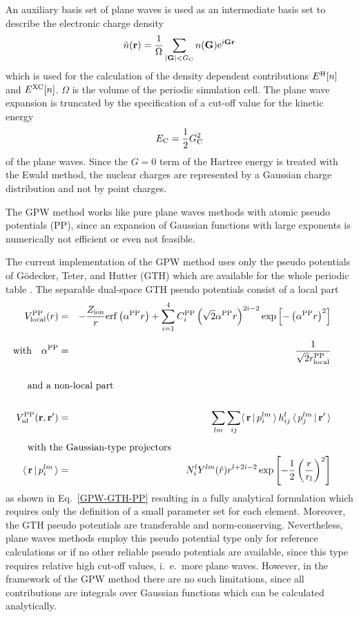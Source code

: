 \documentclass[12pt,twoside,a4paper]{article}
\newcommand{\be}{\begin{equation}}
\newcommand{\ee}{\end{equation}}
\newcommand{\nn}{\nonumber}
\begin{document}
An auxiliary basis set of plane waves is used as an intermediate basis set
to describe the electronic charge density
\be
 \tilde n({\bf r}) = \frac{1}{\Omega}\sum_{|{\bf G}| < G_{\rm C}}
                     n({\bf G}) {\rm e}^{i {\bf Gr}}
\ee
which is used for the calculation of the density dependent contributions
$E^{\rm H}[n]$ and $E^{\rm XC}[n]$.
$\Omega$ is the volume of the periodic simulation cell.
The plane wave expansion is truncated by the specification of a
cut-off value for the kinetic energy
\be
 E_{\rm C} = \frac{1}{2} G_{\rm C}^2
\ee
of the plane waves.
Since the $G = 0$ term of the Hartree energy is treated with the Ewald method,
the nuclear charges are represented by a Gaussian charge distribution and not
by point charges.

The GPW method works like pure plane waves methods with atomic pseudo
potentials (PP), since an expansion of Gaussian functions with large
exponents is numerically not efficient or even not feasible.

The current implementation of the GPW method uses only the pseudo potentials
of G\"o\-decker, Teter, and Hutter (GTH) \cite{GTH:1996} which are available for
the whole periodic table \cite{GTH:1998}. The separable dual-space GTH pseudo
potentials consist of a local part
\begin{eqnarray}
 V^{\rm PP}_{\rm local}(r)
  & = & -\frac{Z_{\rm ion}}{r} {\rm erf} \left( \alpha^{\rm PP} r \right) +
        \sum_{i=1}^4
         C^{\rm PP}_i \left( \sqrt{2} \alpha^{\rm PP} r \right)^{2i-2}
         \exp\left[ -\left( \alpha^{\rm PP} r \right)^2 \right]\\[2mm]
 \mbox{with}\quad\alpha^{\rm PP}
  & = & \frac{1}{\sqrt{2}r^{\rm PP}_{\rm local}}\nn\\[5mm]
\noalign{and a non-local part}\nn\\
 V^{\rm PP}_{\rm nl}({\bf r},{\bf r'}) & = &
  \sum\limits_{lm} \sum\limits_{ij} \langle\,{\bf r}\,|\,p_i^{lm} \,\rangle
  \,h_{ij}^{l}\,\langle\,p_j^{lm} \,|\,{\bf r'} \,\rangle \\[2mm]
 \noalign{with the Gaussian-type projectors}
 \langle\, {\bf r}\,|\,p_i^{lm}\,\rangle & = &
 N_i^{l} Y^{lm}(\hat r) r^{l+2i-2}
 \exp\left[-\frac{1}{2}\left(\frac{r}{r_l}\right)^2\right]\nn
\end{eqnarray}
as shown in Eq.~\ref{GPW-GTH-PP}
resulting in a fully analytical formulation which requires only
the definition of a small parameter set for each element. Moreover,
the GTH pseudo potentials are transferable and norm-conserving.
Nevertheless, plane waves methods employ this pseudo potential type
only for reference calculations or if no other reliable pseudo
potentials are available, since this type requires relative   
high cut-off values, i.~e.\ more plane waves.
However, in the framework of the GPW method there are no such
limitations, since all contributions are integrals over Gaussian
functions which can be calculated analytically.
\newpage


\printindex
\end{document}
